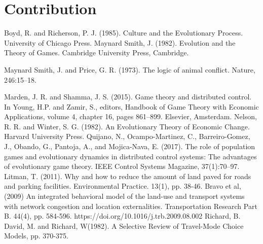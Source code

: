 \documentclass[12pt]{report}
\begin{document}
\chapter{Contribution}

\begin{thebibliography}{2}
Boyd, R. and Richerson, P. J. (1985). Culture and the Evolutionary Process. University of Chicago Press.
Maynard Smith, J. (1982). Evolution and the Theory of Games. Cambridge University Press, Cambridge.

Maynard Smith, J. and Price, G. R. (1973). The logic of animal conflict. Nature, 246:15–18. 

Marden, J. R. and Shamma, J. S. (2015). Game theory and distributed control. In Young, H.P. and Zamir, S., editors, Handbook of Game Theory with Economic Applications, volume 4, chapter 16, pages 861–899. Elsevier, Amsterdam.
Nelson, R. R. and Winter, S. G. (1982). An Evolutionary Theory of Economic Change. Harvard University Press.
Quijano, N., Ocampo-Martinez, C., Barreiro-Gomez, J., Obando, G., Pantoja, A., and Mojica-Nava, E. (2017). The role of population games and evolutionary dynamics in distributed control systems: The advantages of evolutionary game theory. IEEE Control Systems Magazine, 37(1):70–97.
Litman, T. (2011). Why and how to reduce the amount of land paved for roads
and parking facilities. Environmental Practice. 13(1), pp. 38-46.
Bravo et al, (2009) An integrated behavioral model of the land-use and transport systems with network congestion and location externalities. Transportation Research Part B. 44(4), pp. 584-596.
https://doi.org/10.1016/j.trb.2009.08.002
Richard, B. David, M. and Richard, W(1982). A Selective Review of Travel-Mode Choice Models, pp. 370-375.
\end{thebibliography}
\end{document}
